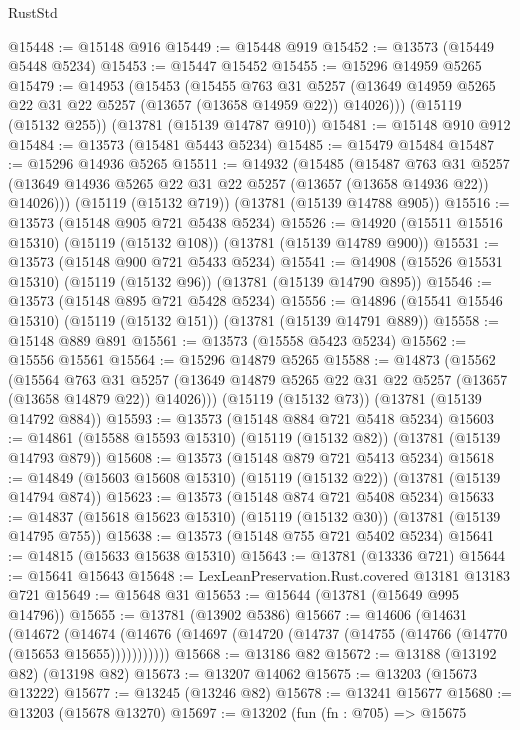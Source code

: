 \begin{lexlean}{RustStd}
\begin{coremodule}
@15448 := @15148 @916
@15449 := @15448 @919
@15452 := @13573 (@15449 @5448 @5234)
@15453 := @15447 @15452
@15455 := @15296 @14959 @5265
@15479 := @14953
    (@15453
      (@15455
        @763
        @31
        @5257
        (@13649 @14959 @5265 @22 @31 @22 @5257 (@13657 (@13658 @14959 @22)) @14026)))
    (@15119 (@15132 @255))
    (@13781 (@15139 @14787 @910))
@15481 := @15148 @910 @912
@15484 := @13573 (@15481 @5443 @5234)
@15485 := @15479 @15484
@15487 := @15296 @14936 @5265
@15511 := @14932
    (@15485
      (@15487
        @763
        @31
        @5257
        (@13649 @14936 @5265 @22 @31 @22 @5257 (@13657 (@13658 @14936 @22)) @14026)))
    (@15119 (@15132 @719))
    (@13781 (@15139 @14788 @905))
@15516 := @13573 (@15148 @905 @721 @5438 @5234)
@15526 := @14920 (@15511 @15516 @15310) (@15119 (@15132 @108)) (@13781 (@15139 @14789 @900))
@15531 := @13573 (@15148 @900 @721 @5433 @5234)
@15541 := @14908 (@15526 @15531 @15310) (@15119 (@15132 @96)) (@13781 (@15139 @14790 @895))
@15546 := @13573 (@15148 @895 @721 @5428 @5234)
@15556 := @14896 (@15541 @15546 @15310) (@15119 (@15132 @151)) (@13781 (@15139 @14791 @889))
@15558 := @15148 @889 @891
@15561 := @13573 (@15558 @5423 @5234)
@15562 := @15556 @15561
@15564 := @15296 @14879 @5265
@15588 := @14873
    (@15562
      (@15564
        @763
        @31
        @5257
        (@13649 @14879 @5265 @22 @31 @22 @5257 (@13657 (@13658 @14879 @22)) @14026)))
    (@15119 (@15132 @73))
    (@13781 (@15139 @14792 @884))
@15593 := @13573 (@15148 @884 @721 @5418 @5234)
@15603 := @14861 (@15588 @15593 @15310) (@15119 (@15132 @82)) (@13781 (@15139 @14793 @879))
@15608 := @13573 (@15148 @879 @721 @5413 @5234)
@15618 := @14849 (@15603 @15608 @15310) (@15119 (@15132 @22)) (@13781 (@15139 @14794 @874))
@15623 := @13573 (@15148 @874 @721 @5408 @5234)
@15633 := @14837 (@15618 @15623 @15310) (@15119 (@15132 @30)) (@13781 (@15139 @14795 @755))
@15638 := @13573 (@15148 @755 @721 @5402 @5234)
@15641 := @14815 (@15633 @15638 @15310)
@15643 := @13781 (@13336 @721)
@15644 := @15641 @15643
@15648 := LexLeanPreservation.Rust.covered @13181 @13183 @721
@15649 := @15648 @31
@15653 := @15644 (@13781 (@15649 @995 @14796))
@15655 := @13781 (@13902 @5386)
@15667 := @14606
    (@14631
      (@14672
        (@14674 (@14676 (@14697 (@14720 (@14737 (@14755 (@14766 (@14770 (@15653 @15655)))))))))))
@15668 := @13186 @82
@15672 := @13188 (@13192 @82) (@13198 @82)
@15673 := @13207 @14062
@15675 := @13203 (@15673 @13222)
@15677 := @13245 (@13246 @82)
@15678 := @13241 @15677
@15680 := @13203 (@15678 @13270)
@15697 := @13202
    (fun (fn : @705) =>
    @15675

\end{coremodule}
\end{lexlean}
